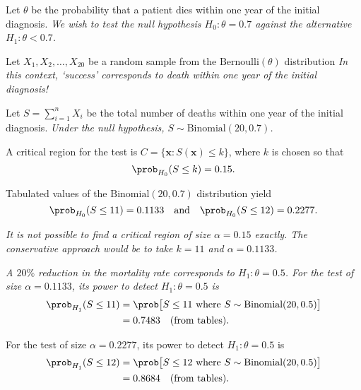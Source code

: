 \begin{solution}
Let $\theta$ be the probability that a patient dies within one year of the initial diagnosis.
\bit
\it We wish to test the null hypothesis $H_0:\theta=0.7$ against the alternative $H_1:\theta<0.7$.
\eit

\vspace{2ex}
Let $X_1,X_2,\ldots,X_{20}$ be a random sample from the $\text{Bernoulli}(\theta)$ distribution
\bit
\it In this context, `success' corresponds to death within one year of the initial diagnosis!
\eit

\vspace{2ex}
Let $S=\sum_{i=1}^n X_i$ be the total number of deaths within one year of the initial diagnosis.
\bit
\it Under the null hypothesis, $S\sim\text{Binomial}(20,0.7)$.
\eit

\vspace{2ex}
A critical region for the test is $C=\{\mathbf{x}:S(\mathbf{x})\leq k\}$, where $k$ is chosen so that 
\[
\prob_{H_0}(S\leq k) = 0.15.
\]



Tabulated values of the $\text{Binomial}(20,0.7)$ distribution yield
\[
\prob_{H_0}(S\leq 11) = 0.1133 \text{\quad and\quad}\prob_{H_0}(S\leq 12) = 0.2277.
\]

\vspace*{-1ex}
\bit
\it It is not possible to find a critical region of size $\alpha=0.15$ exactly.
\it The conservative approach would be to take $k=11$ and $\alpha=0.1133$.
\eit

\vspace*{2ex}
\bit
\it A $20\%$ reduction in the mortality rate corresponds to $H_1:\theta=0.5$.
\eit
\vspace*{1ex}
For the test of size $\alpha=0.1133$, its power to detect $H_1:\theta=0.5$ is
\begin{align*}
\prob_{H_1}(S\leq 11) 
	& = \prob\big[S\leq 11 \text{ where } S\sim\text{Binomial}(20,0.5)\big] \\
	& = 0.7483 \text{\quad (from tables)}.
\end{align*}

For the test of size $\alpha=0.2277$, its power to detect $H_1:\theta=0.5$ is
\begin{align*}
\prob_{H_1}(S\leq 12) 
	& = \prob\big[S\leq 12 \text{ where } S\sim\text{Binomial}(20,0.5)\big] \\
	& = 0.8684 \text{\quad (from tables)}.
\end{align*}

\end{solution}


